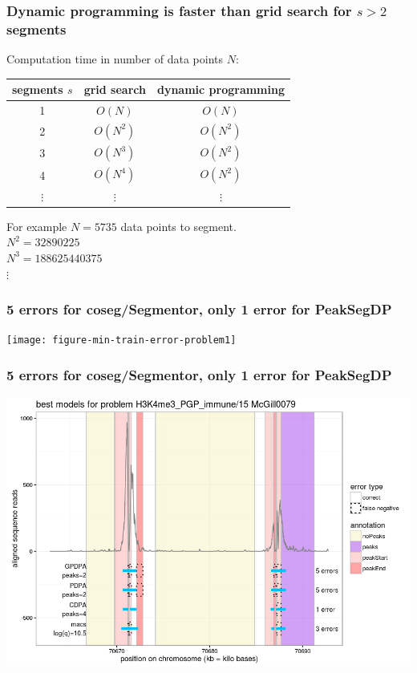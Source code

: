 \documentclass{beamer}
\begin{document}
\begin{frame}
  \frametitle{Dynamic programming is faster than grid search for $s>
    2$ segments}

  Computation time in number of data points $N$:

  \vskip 1cm

  \begin{tabular}{ccc}
    segments $s$ & grid search & dynamic programming \\
    \hline
    1 & $O(N)$ & $O(N)$ \\
    2 & $O(N^2)$ & $O(N^2)$ \\
    3 & $O(N^3)$ & $O(N^2)$ \\
    4 & $O(N^4)$ & $O(N^2)$ \\
    $\vdots$ &     $\vdots$ &     $\vdots$ 
  \end{tabular}

  \vskip 1cm

  For example $N = 5735$ data points to segment.\\
  $N^2 = 32890225$\\
  $N^3 = 188625440375$\\
  $\vdots$
\end{frame}



\begin{frame}
  \frametitle{5 errors for coseg/Segmentor, only 1 error for PeakSegDP}
  \texttt{[image: figure-min-train-error-problem1]}
\end{frame}

\begin{frame}
  \frametitle{5 errors for coseg/Segmentor, only 1 error for PeakSegDP}
  \includegraphics[width=\textwidth]{figure-min-train-error-problem1-best.png}
\end{frame}
\end{document}
